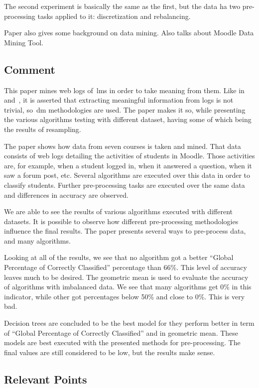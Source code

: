The second experiment is basically the same as the first, but the data ha two
pre-processing tasks applied to it: discretization and rebalancing.

Paper also gives some background on data mining. Also talks about Moodle Data
Mining Tool.

\subsection{Comment}

This paper mines web logs of~\gls{lms} in order to take meaning from them. Like
in~\cite{ind_001} and~\cite{ind_002}, it is asserted that extracting meaningful
information from logs is not trivial, so~\gls{dm} methodologies are used. The
paper makes it so, while presenting the various algorithms testing with
different dataset, having some of which being the results of resampling.

The paper shows how data from seven courses is taken and mined. That data
consists of web logs detailing the activities of students in Moodle. Those
activities are, for example, when a student logged in, when it answered a
question, when it saw a forum post, etc. Several algorithms are executed over
this data in order to classify students. Further pre-processing tasks are
executed over the same data and differences in accuracy are observed.

We are able to see the results of various algorithms executed with different
datasets. It is possible to observe how different pre-processing methodologies
influence the final results. The paper presents several ways to pre-process
data, and many algorithms.

Looking at all of the results, we see that no algorithm got a better ``Global
Percentage of Correctly Classified'' percentage than 66\%. This level of
accuracy leaves much to be desired. The geometric mean is used to evaluate the
accuracy of algorithms with imbalanced data. We see that many algorithms get
0\% in this indicator, while other got percentages below 50\% and close to 0\%.
This is very bad.

Decision trees are concluded to be the best model for they perform better in
term of ``Global Percentage of Correctly Classified'' and in geometric mean.
These models are best executed with the presented methods for pre-processing.
The final values are still considered to be low, but the results make sense.

\subsection{Relevant Points}

